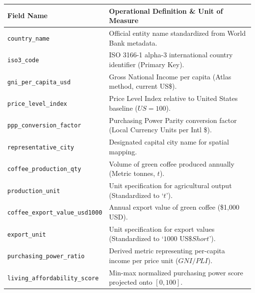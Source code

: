 \documentclass[11pt,a4paper]{article}
\begin{document}
\begin{longtable}{@{}p{5.5cm}p{9.5cm}@{}}
\toprule
\textbf{Field Name} & \textbf{Operational Definition \& Unit of Measure} \\
\midrule
\endhead
\texttt{country\_name} & Official entity name standardized from World Bank metadata. \\
\addlinespace
\texttt{iso3\_code} & ISO 3166-1 alpha-3 international country identifier (Primary Key). \\
\addlinespace
\texttt{gni\_per\_capita\_usd} & Gross National Income per capita (Atlas method, current US\$). \\
\addlinespace
\texttt{price\_level\_index} & Price Level Index relative to United States baseline ($US = 100$). \\
\addlinespace
\texttt{ppp\_conversion\_factor} & Purchasing Power Parity conversion factor (Local Currency Units per Intl \$). \\
\addlinespace
\texttt{representative\_city} & Designated capital city name for spatial mapping. \\
\addlinespace
\texttt{coffee\_production\_qty} & Volume of green coffee produced annually (Metric tonnes, $t$). \\
\addlinespace
\texttt{production\_unit} & Unit specification for agricultural output (Standardized to `$t$'). \\
\addlinespace
\texttt{coffee\_export\_value\_usd1000} & Annual export value of green coffee (\$1,000 USD). \\
\addlinespace
\texttt{export\_unit} & Unit specification for export values (Standardized to `$1000\text{ US}\$Short$'). \\
\addlinespace
\texttt{purchasing\_power\_ratio} & Derived metric representing per-capita income per price unit ($GNI / PLI$). \\
\addlinespace
\texttt{living\_affordability\_score} & Min-max normalized purchasing power score projected onto $[0, 100]$. \\
\bottomrule
\end{longtable}
\end{document}

